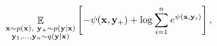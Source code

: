 \documentclass{article}
\begin{document}
    \begin{equation*}
      \mathop{\mathbb{E}}\limits_{{\substack{
            \xx \sim p(\xx),\ 
            \yy_+ \sim p(\yy|\xx)\\
            \yy_1,\dots,\yy_n \sim q(\yy|\xx)\\
        }}}
        \left[ - \psi(\xx, \yy_+) + \log \sum_{i=1}^{n} e^{\psi(\xx, \yy_i)}
        \right],
    \end{equation*}
    
\end{document}
